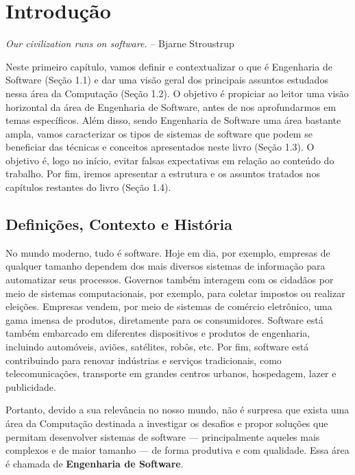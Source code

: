 \documentclass[
  11pt,
  twoside]{book}
\renewenvironment{quote}{\centering \vspace{1.5ex} \begin{tcolorbox}[colback=backcolor, width=4.9in]}{\end{tcolorbox}}
\begin{document}
\mainmatter

\hypertarget{introduuxe7uxe3o}{%
\chapter{Introdução}\label{introduuxe7uxe3o}}

\begin{quote}
\emph{Our civilization runs on software.} -- Bjarne Stroustrup
\end{quote}

Neste primeiro capítulo, vamos definir e contextualizar o que é
Engenharia de Software (Seção 1.1) e dar uma visão geral dos principais
assuntos estudados nessa área da Computação (Seção 1.2). O objetivo é
propiciar ao leitor uma visão horizontal da área de Engenharia de
Software, antes de nos aprofundarmos em temas específicos. Além disso,
sendo Engenharia de Software uma área bastante ampla, vamos caracterizar
os tipos de sistemas de software que podem se beneficiar das técnicas e
conceitos apresentados neste livro (Seção 1.3). O objetivo é, logo no
início, evitar falsas expectativas em relação ao conteúdo do trabalho.
Por fim, iremos apresentar a estrutura e os assuntos tratados nos
capítulos restantes do livro (Seção 1.4).

\hypertarget{definiuxe7uxf5es-contexto-e-histuxf3ria}{%
\section{Definições, Contexto e
História}\label{definiuxe7uxf5es-contexto-e-histuxf3ria}}

No mundo moderno, tudo é software. Hoje em dia, por exemplo, empresas de
qualquer tamanho dependem dos mais diversos sistemas de informação para
automatizar seus processos. Governos também interagem com os cidadãos
por meio de sistemas computacionais, por exemplo, para coletar impostos
ou realizar eleições. Empresas vendem, por meio de sistemas de comércio
eletrônico, uma gama imensa de produtos, diretamente para os
consumidores. Software está também embarcado em diferentes dispositivos
e produtos de engenharia, incluindo automóveis, aviões, satélites,
robôs, etc. Por fim, software está contribuindo para renovar indústrias
e serviços tradicionais, como telecomunicações, transporte em grandes
centros urbanos, hospedagem, lazer e publicidade.

Portanto, devido a sua relevância no nosso mundo, não é surpresa que
exista uma área da Computação destinada a investigar os desafios e
propor soluções que permitam desenvolver sistemas de software ---
principalmente aqueles mais complexos e de maior tamanho --- de forma
produtiva e com qualidade. Essa área é chamada de \textbf{Engenharia de
Software}.
\end{document}

